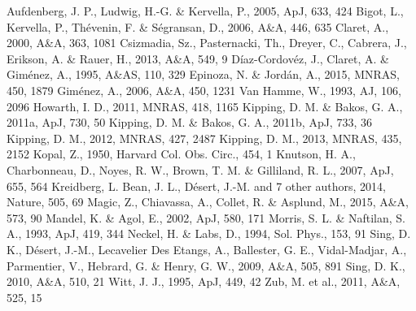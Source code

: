 Aufdenberg, J. P., Ludwig, H.-G. \& Kervella, P., 2005, ApJ, 633, 424
Bigot, L., Kervella, P., Th\'evenin, F. \& S\'egransan, D., 2006, A\&A, 446,
635
Claret, A., 2000, A\&A, 363, 1081
Csizmadia, Sz., Pasternacki, Th., Dreyer, C., Cabrera, J., Erikson, A. \& 
Rauer, H., 2013, A\&A, 549, 9
D\'iaz-Cordov\'ez, J., Claret, A. \& Gim\'enez, A., 1995, A\&AS, 110, 329
Epinoza, N. \& Jord\'an, A., 2015, MNRAS, 450, 1879
Gim\'enez, A., 2006, A\&A, 450, 1231
Van Hamme, W., 1993, AJ, 106, 2096
Howarth, I. D., 2011, MNRAS, 418, 1165
Kipping, D. M. \& Bakos, G. A., 2011a, ApJ, 730, 50
Kipping, D. M. \& Bakos, G. A., 2011b, ApJ, 733, 36
Kipping, D. M., 2012, MNRAS, 427, 2487
Kipping, D. M., 2013, MNRAS, 435, 2152
Kopal, Z., 1950, Harvard Col. Obs. Circ., 454, 1
Knutson, H. A., Charbonneau, D., Noyes, R. W., Brown, T. M. \& Gilliland, R. L.,
2007, ApJ, 655, 564
Kreidberg, L. Bean, J. L., D\'esert, J.-M. and 7 other authors, 2014, Nature,
505, 69
Magic, Z., Chiavassa, A., Collet, R. \& Asplund, M., 2015, A\&A, 573, 90
Mandel, K. \& Agol, E., 2002, ApJ, 580, 171
Morris, S. L. \& Naftilan, S. A., 1993, ApJ, 419, 344
Neckel, H. \& Labs, D., 1994, Sol. Phys., 153, 91
Sing, D. K., D\'esert, J.-M., Lecavelier Des Etangs, A., Ballester, G. E., 
Vidal-Madjar, A., Parmentier, V., Hebrard, G. \& Henry, G. W., 2009, A\&A, 505,
891
Sing, D. K., 2010, A\&A, 510, 21
Witt, J. J., 1995, ApJ, 449, 42
Zub, M. et al., 2011, A\&A, 525, 15



